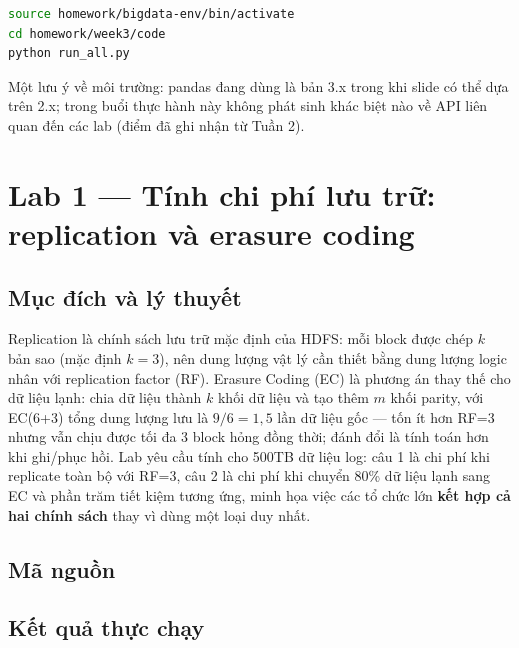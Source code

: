 \documentclass[12pt,a4paper,oneside]{article}
\begin{document}
\begin{lstlisting}[language=bash, caption={Lệnh kích hoạt môi trường và chạy toàn bộ lab}, label={lst:chaylab}]
source homework/bigdata-env/bin/activate
cd homework/week3/code
python run_all.py
\end{lstlisting}

Một lưu ý về môi trường: pandas đang dùng là bản 3.x trong khi slide có thể dựa trên 2.x; trong buổi thực hành này không phát sinh khác biệt nào về API liên quan đến các lab (điểm đã ghi nhận từ Tuần 2).

\section{Lab 1 --- Tính chi phí lưu trữ: replication và erasure coding}
\label{sec:lab1}

\subsection{Mục đích và lý thuyết}

Replication là chính sách lưu trữ mặc định của HDFS: mỗi block được chép $k$ bản sao (mặc định $k=3$), nên dung lượng vật lý cần thiết bằng dung lượng logic nhân với replication factor (RF). Erasure Coding (EC) là phương án thay thế cho dữ liệu lạnh: chia dữ liệu thành $k$ khối dữ liệu và tạo thêm $m$ khối parity, với EC(6+3) tổng dung lượng lưu là $9/6 = 1{,}5$ lần dữ liệu gốc --- tốn ít hơn RF=3 nhưng vẫn chịu được tối đa 3 block hỏng đồng thời; đánh đổi là tính toán hơn khi ghi/phục hồi. Lab yêu cầu tính cho 500TB dữ liệu log: câu 1 là chi phí khi replicate toàn bộ với RF=3, câu 2 là chi phí khi chuyển 80\% dữ liệu lạnh sang EC và phần trăm tiết kiệm tương ứng, minh họa việc các tổ chức lớn \textbf{kết hợp cả hai chính sách} thay vì dùng một loại duy nhất.

\subsection{Mã nguồn}



\subsection{Kết quả thực chạy}
\end{document}
